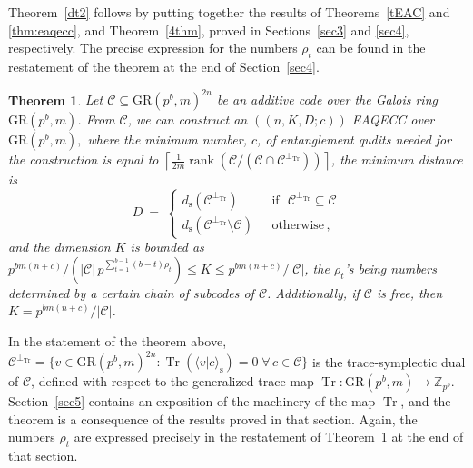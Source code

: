 \documentclass{article}
\DeclareMathOperator{\Tr}{Tr}
\DeclareMathOperator{\rank}{rank}
\newtheorem{thm}{Theorem}[section]
\theoremstyle{remark}
\theoremstyle{definition}
\numberwithin{equation}{section}
\begin{document}
\medskip

Theorem~\ref{dt2} follows by putting together the results of Theorems~\ref{tEAC} and \ref{thm:eaqecc}, and Theorem~\ref{4thm}, proved in Sections~\ref{sec3} and \ref{sec4}, respectively. The precise expression for the numbers $\rho_t$ can be found in the restatement of the theorem at the end of Section~\ref{sec4}.


\begin{thm}\label{dt3} Let $\mathcal{C} \subseteq \text{GR}(p^b,m)^{2n}$ be an additive code over the Galois ring $\text{GR}(p^b,m)$.   From $\mathcal{C}$, we can construct an  $((n,K,D;c))$ EAQECC over $\text{GR}(p^b,m),$ where the minimum number, $c$, of entanglement qudits needed for the construction is equal to  $\left\lceil \frac1{2m}\rank(\mathcal{C}/(\mathcal{C} \cap \mathcal{C}^{\perp_{{\Tr}}}))  \right\rceil$, the minimum distance is 
\begin{equation*}
D~=~\left\{\begin{array}{ll}
d_{\mathrm{s}}(\mathcal{C}^{\perp_{{\Tr}}}) & \text{~~if~~} \mathcal{C}^{\perp_{{\Tr}}} \subseteq \mathcal{C} \\
d_{\mathrm{s}}(\mathcal{C}^{\perp_{{\Tr}}}\setminus \mathcal{C} )  & \text{~~otherwise}\, , 
\end{array}\right.
\end{equation*}
and the dimension $K$ is bounded as $p^{bm(n+c)}/ (|\mathcal{C}| \, {p^{\sum_{t=1}^{b-1} (b-t)\rho_t}}) \leq  K \leq p^{bm(n+c)}/|\mathcal{C}|$, the $\rho_t$'s being numbers determined by a certain chain of subcodes of $\mathcal{C}$. Additionally, if $\mathcal{C}$ is free, then $K = p^{bm(n+c)}/|\mathcal{C}|$.
\end{thm}

In the statement of the theorem above, $\mathcal{C}^{\perp_{{\Tr}}}=\{v \in \text{GR}(p^b,m)^{2n} :{\Tr}( \langle v | c\rangle_{\text{s}}) = 0 \; \forall \, c \in \mathcal{C}\}$ is the trace-symplectic dual of $\mathcal{C}$, defined with respect to the generalized trace map ${\Tr}: \text{GR}(p^b,m) \to \mathbb{Z}_{p^b}$. Section~\ref{sec5} contains an exposition of the machinery of the map $\Tr$, and the theorem is a consequence of the results proved in that section. Again, the numbers $\rho_t$ are expressed precisely in the restatement of Theorem~\ref{dt3} at the end of that section.
\end{document}
